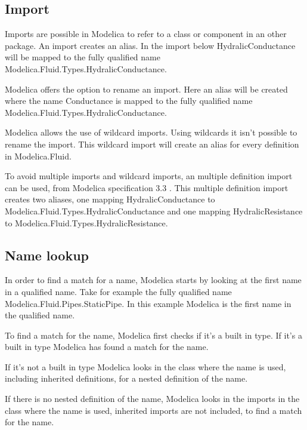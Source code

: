 \documentclass{cslthse-msc}
\begin{document}
\subsection{Import}
Imports are possible in Modelica to refer to a class or component in an other package. An import creates an alias. In the import below HydralicConductance will be mapped to the fully qualified name Modelica.Fluid.Types.HydralicConductance.



Modelica offers the option to rename an import. Here an alias will be created where the name Conductance is mapped to the fully qualified name Modelica.Fluid.Types.HydralicConductance.



Modelica allows the use of wildcard imports. Using wildcards it isn't possible to rename the import. This wildcard import will create an alias for every definition in Modelica.Fluid.



To avoid multiple imports and wildcard imports, an multiple definition import can be used, from Modelica specification 3.3 \cite{modelicamodelica}. This multiple definition import creates two aliases, one mapping HydralicConductance to Modelica.Fluid.Types.HydralicConductance and one mapping HydralicResistance to Modelica.Fluid.Types.HydralicResistance.



\subsection{Name lookup}
In order to find a match for a name, Modelica starts by looking at the first name in a qualified name. Take for example the fully qualified name Modelica.Fluid.Pipes.StaticPipe. In this example Modelica is the first name in the qualified name.

To find a match for the name, Modelica first checks if it's a built in type. If it's a built in type Modelica has found a match for the name.

If it's not a built in type Modelica looks in the class where the name is used, including inherited definitions, for a nested definition of the name. 

If there is no nested definition of the name, Modelica looks in the imports in the class where the name is used, inherited imports are not included, to find a match for the name.
\end{document}
